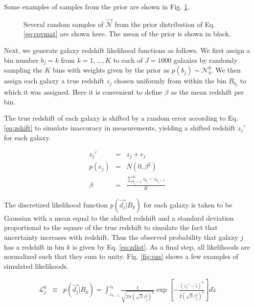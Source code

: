 \documentclass[12pt, onecolumn]{emulateapj}
\begin{document}
Some examples of samples from the prior are shown in Fig. \ref{fig:priors}.

\begin{figure}
\label{fig:priors}
\caption{Several random samples of $\vec{\mathcal{N}}$ from the prior distribution of Eq. \ref{eq:covmat} are shown here.  The mean of the prior is shown in black.}
\end{figure}

Next, we generate galaxy redshift likelihood functions as follows.  We first assign a bin number $b_{j}=k$ from $k=1,\dots,K$ to each of $J=1000$ galaxies by randomly sampling the $K$ bins with weights given by the prior as $p(b_{j})\sim\mathcal{N}^{0}_{k}$.  We then assign each galaxy a true redshift $z_{j}$ chosen uniformly from within the bin $B_{b_{j}}$ to which it was assigned.  Here it is convenient to define $\beta$ as the mean redshift per bin.

The true redshift of each galaxy is shifted by a random error according to Eq. \ref{eq:zshift} to simulate inaccuracy in measurements, yielding a shifted redshift $z_{j}'$ for each galaxy.  

\begin{mathletters}
\begin{eqnarray}
\label{eq:zshift}
z_{j}' &=& z_{j}+e_{j}\\
p(e_{j}) &=& N(0,\beta^{2})\nonumber\\
\beta &=& \frac{\sum_{b_{j}=1}^{K}z_{b_{j}}-z_{b_{j}-1}}{K}\nonumber
\end{eqnarray}
\end{mathletters}

The discretized likelihood function $p(\vec{d_{j}}|B_{k})$ for each galaxy is taken to be Gaussian with a mean equal to the shifted redshift and a standard deviation proportional to the square of the true redshift to simulate the fact that uncertainty increases with redshift.  Thus the observed probability that galaxy $j$ has a redshift in bin $k$ is given by Eq. \ref{eq:zdist}.  As a final step, all likelihoods are normalized such that they sum to unity.  Fig. \ref{fig:pzs} shows a few examples of  simulated likelihoods.

\begin{eqnarray}
\label{eq:zdist}
\mathcal{L}_{j}^{k} &\equiv& p(\vec{d_{j}}|B_{k}) = \int_{z_{k-1}}^{z_{k}} \frac{1}{\sqrt{2\pi(\sqrt{\beta}z_{j}^{2})^{2}}}\exp\left[-\frac{(z_{j}'-\tilde{z})^{2}}{2(\sqrt{\beta}z_{j}^{2})^{2}}\right]d\tilde{z}
\end{eqnarray}
\end{document}
